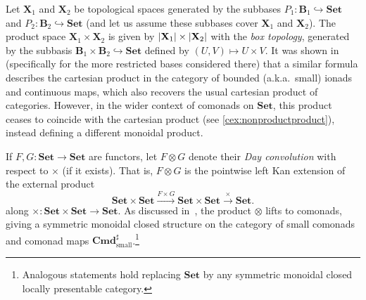 \documentclass[11pt, oneside, article]{memoir}
\theoremstyle{plain}
\theoremstyle{definition}
\theoremstyle{remark}
\newenvironment{remark}
{\renewcommand\qedsymbol{$\lrcorner$}%
  \pushQED{\qed}\myremark}
{\popQED\endmyremark}
\DeclarePairedDelimiter{\abs}{\lvert}{\rvert}
\newcommand{\xto}[1]{\xrightarrow{#1}}
\newcommand{\namedcat}[1]{\mathbf{#1}}
\newcommand{\cat}[1]{\mathbf{#1}}
\newcommand{\spa}[1]{\mathbf{#1}}
\newcommand{\Set}{\namedcat{Set}}
\newcommand{\Com}{\namedcat{Cmd}^\sharp}
\newcommand{\pts}[1]{{\abs{#1}}}
\newcommand{\ph}[1]{#1}
\newcommand{\AccCom}{\Com_{\mathrm{small}}}
\newcommand{\AccComSet}{\AccCom}
\newcommand{\bB}{\cat{B}}
\newcommand{\pP}{\ph{P}}
\newcommand{\tX}{\spa{X}}
\newcommand{\anoteNI}[1]{}
\begin{document}
\anoteNI{Is the above fibration a 2-fibration over the 2-category $\Set$
  with the locally indiscrete enrichment? Do the fibers have and the
  reindexing functors preserve 2-limits? Does the analogue of the
  result on limits for fibrations hold for 2-limits for 2-fibrations?
  If all true, we would have 2-completeness.}

\begin{remark}\label{rem:dirichlet}
  Let $\tX_1$ and $\tX_2$ be topological spaces generated by the
  subbases $\pP_1 \colon \bB_1 \hookrightarrow \Set$ and
  $\pP_2 \colon \bB_2 \hookrightarrow \Set$ (and let us assume these
  subbases cover $\tX_1$ and $\tX_2$). The product space
  $\tX_1 \times \tX_2$ is given by $\pts{\tX_1} \times \pts{\tX_2}$
  with the \emph{box topology}, generated by the subbasis
  $\bB_1 \times \bB_2 \hookrightarrow \Set$ defined by
  $(U, V) \mapsto U \times V$. It was shown in \cite{garner:ionads}
  (specifically for the more restricted bases considered there) that a
  similar formula describes the cartesian product in the category of
  bounded (a.k.a.\ small) ionads and continuous maps, which also
  recovers the usual cartesian product of categories. However, in the
  wider context of comonads on $\Set$, this product ceases to coincide
  with the cartesian product (see \cref{cex:nonproductproduct}),
  instead defining a different monoidal product.

  If $F, G \colon \Set \to \Set$ are functors, let $F \otimes G$
  denote their \emph{Day convolution} with respect to $\times$ (if it
  exists).  That is, $F \otimes G$ is the pointwise left Kan extension
  of the external product
  \[\cat{\Set} \times \cat{\Set} \xto{F \times G} \Set \times \Set
    \xto{\times} \Set.\] along
  $\times \colon \Set \times \Set \to \Set$.  As discussed
  in~\cite{mcdermott-rivas-uustalu}, the product $\otimes$ lifts to
  comonads, giving a symmetric monoidal closed structure on the
  category of small comonads and comonad maps
  $\AccComSet$.\footnote{Analogous statements hold replacing $\Set$ by
    any symmetric monoidal closed locally presentable category.}
  

\end{remark}
\end{document}
